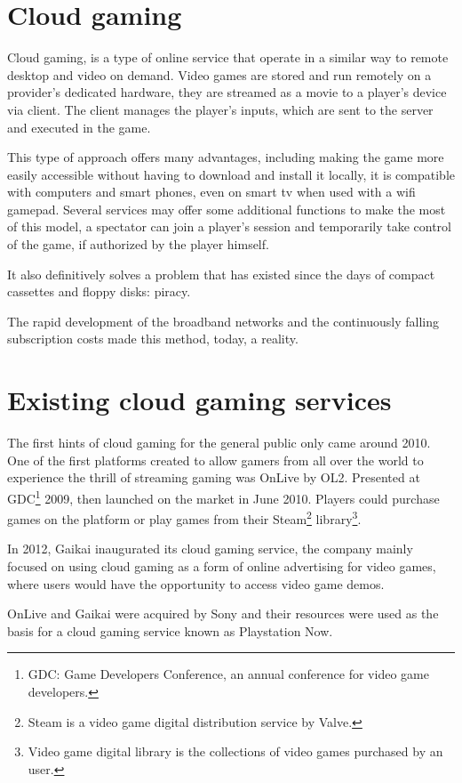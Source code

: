 \section{Cloud gaming}
Cloud gaming, is a type of online service that operate in a similar way to remote desktop and video on demand. Video games are stored and run remotely on a provider's dedicated hardware, they are streamed as a movie to a player's device via client. The client manages the player's inputs, which are sent to the server and executed in the game.

This type of approach offers many advantages, including making the game more easily accessible without having to download and install it locally, it is compatible with computers and smart phones, even on smart tv when used with a wifi gamepad. Several services may offer some additional functions to make the most of this model, a spectator can join a player's session and temporarily take control of the game, if authorized by the player himself.

It also definitively solves a problem that has existed since the days of compact cassettes and floppy disks: piracy.

The rapid development of the broadband networks and the continuously falling subscription costs made this method, today, a reality.

\section{Existing cloud gaming services}
The first hints of cloud gaming for the general public only came around 2010. One of the first platforms created to allow gamers from all over the world to experience the thrill of streaming gaming was OnLive by OL2. Presented at GDC\footnote{GDC: Game Developers Conference, an annual conference for video game developers.} 2009, then launched on the market in June 2010. Players could purchase games on the platform or play games from their Steam\footnote{Steam is a video game digital distribution service by Valve.} library\footnote{Video game digital library is the collections of video games purchased by an user.}.

In 2012, Gaikai inaugurated its cloud gaming service, the company mainly focused on using cloud gaming as a form of online advertising for video games, where users would have the opportunity to access video game demos.

OnLive and Gaikai were acquired by Sony and their resources were used as the basis for a cloud gaming service known as Playstation Now.

